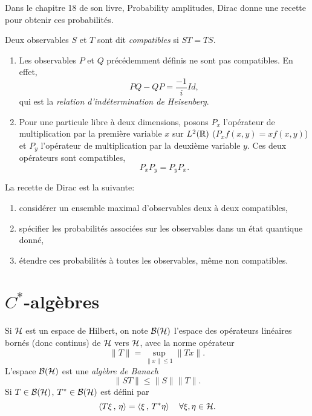  Dans le chapitre 18 de son livre, \og Probability amplitudes\fg{}, Dirac donne une recette pour obtenir ces
 probabilités.

 \begin{defi}
   Deux observables $S$ et $T$ sont dit \emph{compatibles} si $ST = TS$.
 \end{defi}

 \begin{exs}
   \begin{enumerate}
   \item Les observables $P$ et $Q$ précédemment définis ne sont pas compatibles. En effet, 
     \[ PQ - QP = \frac{-1}{i} Id, \]
     qui est  la \emph{relation d'indétermination de
       Heisenberg}.
     
   \item Pour une particule libre à deux dimensions, posons $P_x$ l'opérateur de multiplication par la
     première variable $x$ sur $L^2(\mathbb{R})$ ($P_x f(x,y) = xf(x,y)$) et $P_y$ l'opérateur de multiplication par la
     deuxième variable $y$. Ces deux opérateurs sont compatibles, 
     \[ P_xP_y = P_yP_x. \]
   \end{enumerate}
 \end{exs}

 La recette de Dirac est la suivante:
 \begin{enumerate}
 \item considérer un ensemble maximal d'observables deux à deux compatibles,
 \item spécifier les probabilités associées sur les observables dans un état quantique donné,
 \item étendre ces probabilités à toutes les observables, même non compatibles.
 \end{enumerate}


 \section{$C^\ast$-algèbres}
\label{sec:c-star-algebres}

Si $\mathcal{H}$ est un espace de Hilbert, on note $\mathcal{B}(\mathcal{H})$ l'espace des
opérateurs linéaires bornés (donc continus) de $\mathcal{H}$ vers $\mathcal{H}$, avec la norme opérateur 
\[ \|T\| = \sup_{\|x\| \leq 1} \|Tx\|. \]
L'espace $\mathcal{B}(\mathcal{H})$ est une \emph{algèbre de Banach} 
\[ \|ST\| \leq \|S\|\|T\|. \]
Si $T \in \mathcal{B}(\mathcal{H})$, $T^\ast \in \mathcal{B}(\mathcal{H})$ est défini par 
\[ \left \langle T \xi\, ,\, \eta \right \rangle = \left \langle \xi\, ,\, T^\ast \eta \right \rangle  \quad
  \forall \xi, \eta \in \mathcal{H}.\]


